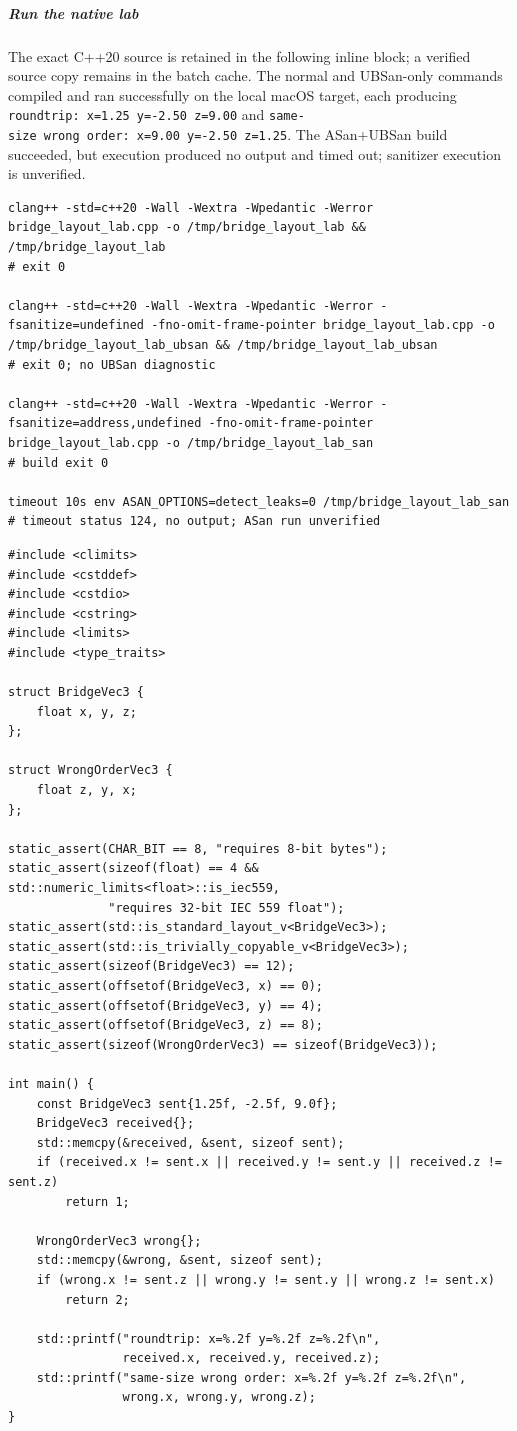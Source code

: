 \subparagraph{Run the native lab}\label{06-engine-ii-ch040-run-the-native-lab}

The exact C++20 source is retained in the following inline block; a verified source copy remains in the batch cache. The normal and UBSan-only commands compiled and ran successfully on the local macOS target, each producing \texttt{roundtrip:\ x=1.25\ y=-2.50\ z=9.00} and \texttt{same-size\ wrong\ order:\ x=9.00\ y=-2.50\ z=1.25}. The ASan+UBSan build succeeded, but execution produced no output and timed out; sanitizer execution is unverified.

\begin{verbatim}
clang++ -std=c++20 -Wall -Wextra -Wpedantic -Werror bridge_layout_lab.cpp -o /tmp/bridge_layout_lab && /tmp/bridge_layout_lab
# exit 0

clang++ -std=c++20 -Wall -Wextra -Wpedantic -Werror -fsanitize=undefined -fno-omit-frame-pointer bridge_layout_lab.cpp -o /tmp/bridge_layout_lab_ubsan && /tmp/bridge_layout_lab_ubsan
# exit 0; no UBSan diagnostic

clang++ -std=c++20 -Wall -Wextra -Wpedantic -Werror -fsanitize=address,undefined -fno-omit-frame-pointer bridge_layout_lab.cpp -o /tmp/bridge_layout_lab_san
# build exit 0

timeout 10s env ASAN_OPTIONS=detect_leaks=0 /tmp/bridge_layout_lab_san
# timeout status 124, no output; ASan run unverified
\end{verbatim}

\begin{verbatim}
#include <climits>
#include <cstddef>
#include <cstdio>
#include <cstring>
#include <limits>
#include <type_traits>

struct BridgeVec3 {
    float x, y, z;
};

struct WrongOrderVec3 {
    float z, y, x;
};

static_assert(CHAR_BIT == 8, "requires 8-bit bytes");
static_assert(sizeof(float) == 4 && std::numeric_limits<float>::is_iec559,
              "requires 32-bit IEC 559 float");
static_assert(std::is_standard_layout_v<BridgeVec3>);
static_assert(std::is_trivially_copyable_v<BridgeVec3>);
static_assert(sizeof(BridgeVec3) == 12);
static_assert(offsetof(BridgeVec3, x) == 0);
static_assert(offsetof(BridgeVec3, y) == 4);
static_assert(offsetof(BridgeVec3, z) == 8);
static_assert(sizeof(WrongOrderVec3) == sizeof(BridgeVec3));

int main() {
    const BridgeVec3 sent{1.25f, -2.5f, 9.0f};
    BridgeVec3 received{};
    std::memcpy(&received, &sent, sizeof sent);
    if (received.x != sent.x || received.y != sent.y || received.z != sent.z)
        return 1;

    WrongOrderVec3 wrong{};
    std::memcpy(&wrong, &sent, sizeof sent);
    if (wrong.x != sent.z || wrong.y != sent.y || wrong.z != sent.x)
        return 2;

    std::printf("roundtrip: x=%.2f y=%.2f z=%.2f\n",
                received.x, received.y, received.z);
    std::printf("same-size wrong order: x=%.2f y=%.2f z=%.2f\n",
                wrong.x, wrong.y, wrong.z);
}
\end{verbatim}

